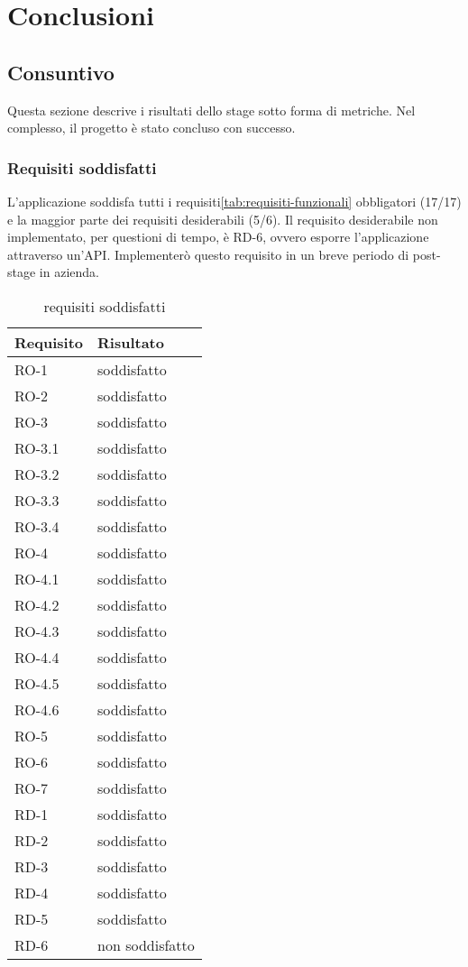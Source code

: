 
\chapter{Conclusioni}
\label{cap:conclusioni}

\section{Consuntivo}
Questa sezione descrive i risultati dello stage sotto forma di metriche. Nel complesso, il progetto è stato concluso con successo.
\subsection{Requisiti soddisfatti}
L'applicazione soddisfa tutti i requisiti\ref{tab:requisiti-funzionali} obbligatori (17/17) e la maggior parte dei requisiti desiderabili (5/6). Il requisito desiderabile non implementato, per questioni di tempo, è RD-6, ovvero esporre l'applicazione attraverso un'API. Implementerò questo requisito in un breve periodo di post-stage in azienda.
\label{tab:requisiti-resoconto}
\begin{longtable}{|l l|}
\caption{requisiti soddisfatti}\\
\hline
\textbf{Requisito} & \textbf{Risultato} \\
\hline
\endhead
RO-1     & soddisfatto\\
RO-2     & soddisfatto\\
RO-3     & soddisfatto\\
RO-3.1   & soddisfatto\\
RO-3.2   & soddisfatto\\
RO-3.3   & soddisfatto\\
RO-3.4   & soddisfatto\\
RO-4     & soddisfatto\\
RO-4.1   & soddisfatto\\
RO-4.2   & soddisfatto\\
RO-4.3   & soddisfatto\\
RO-4.4   & soddisfatto\\
RO-4.5   & soddisfatto\\
RO-4.6   & soddisfatto\\
RO-5     & soddisfatto\\
RO-6     & soddisfatto\\
RO-7     & soddisfatto\\
RD-1     & soddisfatto\\
RD-2     & soddisfatto\\
RD-3     & soddisfatto\\
RD-4     & soddisfatto\\
RD-5     & soddisfatto\\
RD-6     & non soddisfatto\\
\hline
\end{longtable}

